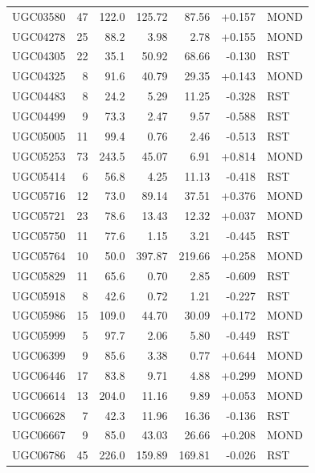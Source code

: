 \documentclass[11pt,a4paper]{article}
\begin{document}
\begin{longtable}{lrrrrrl}
UGC03580             &  47 &  122.0 &   125.72 &    87.56 & +0.157 & MOND \\
UGC04278             &  25 &   88.2 &     3.98 &     2.78 & +0.155 & MOND \\
UGC04305             &  22 &   35.1 &    50.92 &    68.66 & -0.130 & RST \\
UGC04325             &   8 &   91.6 &    40.79 &    29.35 & +0.143 & MOND \\
UGC04483             &   8 &   24.2 &     5.29 &    11.25 & -0.328 & RST \\
UGC04499             &   9 &   73.3 &     2.47 &     9.57 & -0.588 & RST \\
UGC05005             &  11 &   99.4 &     0.76 &     2.46 & -0.513 & RST \\
UGC05253             &  73 &  243.5 &    45.07 &     6.91 & +0.814 & MOND \\
UGC05414             &   6 &   56.8 &     4.25 &    11.13 & -0.418 & RST \\
UGC05716             &  12 &   73.0 &    89.14 &    37.51 & +0.376 & MOND \\
UGC05721             &  23 &   78.6 &    13.43 &    12.32 & +0.037 & MOND \\
UGC05750             &  11 &   77.6 &     1.15 &     3.21 & -0.445 & RST \\
UGC05764             &  10 &   50.0 &   397.87 &   219.66 & +0.258 & MOND \\
UGC05829             &  11 &   65.6 &     0.70 &     2.85 & -0.609 & RST \\
UGC05918             &   8 &   42.6 &     0.72 &     1.21 & -0.227 & RST \\
UGC05986             &  15 &  109.0 &    44.70 &    30.09 & +0.172 & MOND \\
UGC05999             &   5 &   97.7 &     2.06 &     5.80 & -0.449 & RST \\
UGC06399             &   9 &   85.6 &     3.38 &     0.77 & +0.644 & MOND \\
UGC06446             &  17 &   83.8 &     9.71 &     4.88 & +0.299 & MOND \\
UGC06614             &  13 &  204.0 &    11.16 &     9.89 & +0.053 & MOND \\
UGC06628             &   7 &   42.3 &    11.96 &    16.36 & -0.136 & RST \\
UGC06667             &   9 &   85.0 &    43.03 &    26.66 & +0.208 & MOND \\
UGC06786             &  45 &  226.0 &   159.89 &   169.81 & -0.026 & RST \\

\end{longtable}
\end{document}
